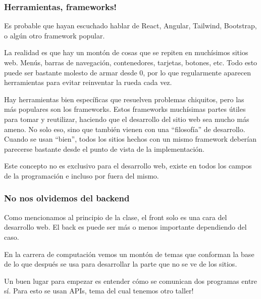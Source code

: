 \begin{frame}
    \frametitle{Herramientas, frameworks!}

    Es probable que hayan escuchado hablar de React, Angular, Tailwind, Bootstrap, o 
    algún otro framework popular. 
    
    La realidad es que hay un montón de cosas que se repiten en muchísimos sitios web.
    Menús, barras de navegación, contenedores, tarjetas, botones, etc. Todo esto 
    puede ser bastante molesto de armar desde 0, por lo que regularmente aparecen 
    herramientas para evitar reinventar la rueda cada vez.

    Hay herramientas bien específicas que resuelven problemas chiquitos, pero las 
    más populares son los frameworks. Estos frameworks muchísimas partes útiles 
    para tomar y reutilizar, haciendo que el desarrollo del sitio web sea mucho más 
    ameno. No solo eso, sino que también vienen con una ``filosofía'' de desarrollo. 
    Cuando se usan ``bien'', todos los sitios hechos con un mismo framework deberían 
    parecerse bastante desde el punto de vista de la implementación.
    
    Este concepto no es exclusivo para el desarrollo web, existe en todos los campos 
    de la programación e incluso por fuera del mismo.

\end{frame}

\begin{frame}
    \frametitle{No nos olvidemos del backend}

    Como mencionamos al principio de la clase, el front solo es una cara del desarrollo web. 
    El back es puede ser más o menos importante dependiendo del caso. 

    En la carrera de computación vemos un montón de temas que conforman la base de lo 
    que después se usa para desarrollar la parte que no se ve de los sitios.

    Un buen lugar para empezar es entender cómo se comunican dos programas entre sí. Para 
    esto se usan APIs, tema del cual tenemos otro taller!

\end{frame}

